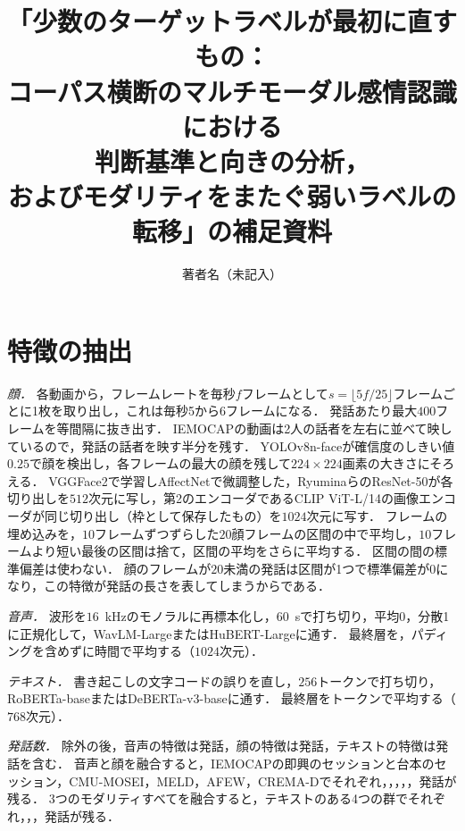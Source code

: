 \documentclass[paper=a4,fontsize=9.5pt,twocolumn,line_length=26zw,number_of_lines=50,head_space=17mm,baselineskip=1.55zw,column_gap=2zw]{jlreq}
\title{「少数のターゲットラベルが最初に直すもの：\\コーパス横断のマルチモーダル感情認識における\\判断基準と向きの分析，\\およびモダリティをまたぐ弱いラベルの転移」の補足資料}
\author{著者名（未記入）}
\date{}
\let\jaorigemph\emph
\renewcommand{\emph}[1]{\jaorigemph{\gtfamily #1}}
\begin{document}
\maketitle

\section{特徴の抽出}
\label{sec:supp-features}

\emph{顔．}
各動画から，フレームレートを毎秒$f$フレームとして$s = \lfloor 5f/25 \rfloor$フレームごとに1枚を取り出し，これは毎秒5から6フレームになる．
発話あたり最大$400$フレームを等間隔に抜き出す．
IEMOCAPの動画は2人の話者を左右に並べて映しているので，発話の話者を映す半分を残す．
YOLOv8n-face\cite{yolov8face}が確信度のしきい値$0.25$で顔を検出し，各フレームの最大の顔を残して$224\times224$画素の大きさにそろえる．
VGGFace2\cite{cao2018vggface2}で学習しAffectNet\cite{mollahosseini2019affectnet}で微調整した，Ryuminaら\cite{ryumina2022facial}のResNet-50が各切り出しを$512$次元に写し，第2のエンコーダであるCLIP ViT-L/14\cite{radford2021clip}の画像エンコーダが同じ切り出し（枠として保存したもの）を$1024$次元に写す．
フレームの埋め込みを，$10$フレームずつずらした$20$顔フレームの区間の中で平均し，$10$フレームより短い最後の区間は捨て，区間の平均をさらに平均する．
区間の間の標準偏差は使わない．
顔のフレームが$20$未満の発話は区間が1つで標準偏差が0になり，この特徴が発話の長さを表してしまうからである．

\emph{音声．}
波形を$16$~kHzのモノラルに再標本化し，$60$~sで打ち切り，平均0，分散1に正規化して，WavLM-Large\cite{chen2022wavlm}またはHuBERT-Large\cite{hsu2021hubert}に通す．
最終層を，パディングを含めずに時間で平均する（$1024$次元）．

\emph{テキスト．}
書き起こしの文字コードの誤りを直し，$256$トークンで打ち切り，RoBERTa-base\cite{liu2019roberta}またはDeBERTa-v3-base\cite{he2023debertav3}に通す．
最終層をトークンで平均する（$768$次元）．

\emph{発話数．}
除外の後，音声の特徴は発話，顔の特徴は発話，テキストの特徴は発話を含む．
音声と顔を融合すると，IEMOCAPの即興のセッションと台本のセッション，CMU-MOSEI，MELD，AFEW，CREMA-Dでそれぞれ，，，，，発話が残る．
3つのモダリティすべてを融合すると，テキストのある4つの群でそれぞれ，，，発話が残る．
\end{document}
